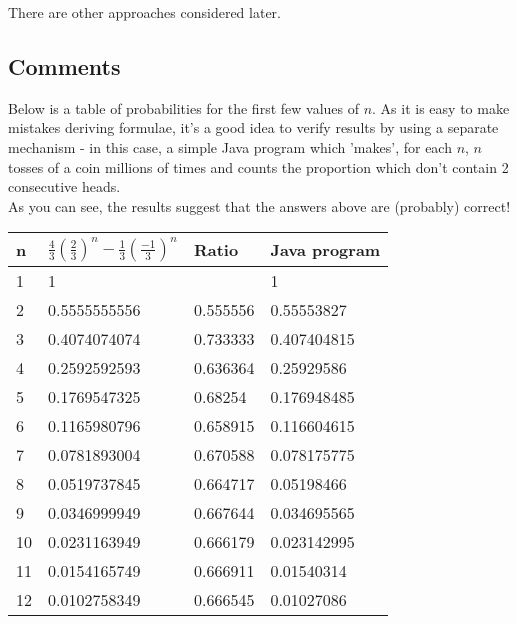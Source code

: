 \documentclass[a4paper,10pt]{article}
\begin{document}
\begin{flushleft}
There are other approaches considered later.

\subsection{Comments}
Below is a table of probabilities for the first few values of $n$. As it is easy to make mistakes deriving formulae, it's a good idea to verify results by using a separate mechanism - in this case, a simple Java program which
 'makes', for each $n$, $n$ tosses of a coin millions of times and counts the proportion which don't contain 2 consecutive heads. \\
As you can see, the results suggest that the answers above are (probably) correct! \\ 
\begin{table}[!hbp]
\begin{tabular}{|l|l|l|l|}
\hline
\textbf{n} & \textbf{$\frac{4}{3} \left(\frac{2}{3}\right)^n - \frac{1}{3} \left(\frac{-1}{3}\right)^n$} & \textbf{Ratio} & \textbf{Java program} \\ \hline
1          & 1                &                & 1                                 \\ \hline
2          & 0.5555555556     & 0.555556       & 0.55553827                        \\ \hline
3          & 0.4074074074     & 0.733333       & 0.407404815                       \\ \hline
4          & 0.2592592593     & 0.636364       & 0.25929586                        \\ \hline
5          & 0.1769547325     & 0.68254        & 0.176948485                       \\ \hline
6          & 0.1165980796     & 0.658915       & 0.116604615                       \\ \hline
7          & 0.0781893004     & 0.670588       & 0.078175775                       \\ \hline
8          & 0.0519737845     & 0.664717       & 0.05198466                        \\ \hline
9          & 0.0346999949     & 0.667644       & 0.034695565                       \\ \hline
10         & 0.0231163949     & 0.666179       & 0.023142995                       \\ \hline
11         & 0.0154165749     & 0.666911       & 0.01540314                        \\ \hline
12         & 0.0102758349     & 0.666545       & 0.01027086                        \\ \hline
\end{tabular}
\end{table}


\end{flushleft}
\end{document}
